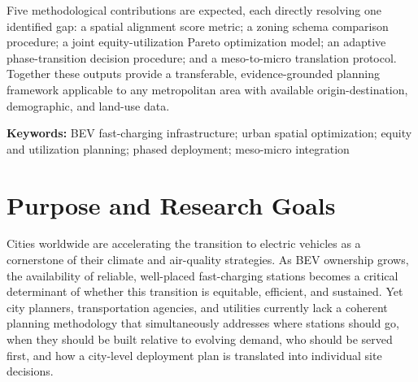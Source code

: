 \documentclass[12pt,letterpaper]{article}
\begin{document}
Five methodological contributions are expected, each directly resolving
one identified gap: a spatial alignment score metric; a zoning schema
comparison procedure; a joint equity-utilization Pareto optimization
model; an adaptive phase-transition decision procedure; and a
meso-to-micro translation protocol.  Together these outputs provide
a transferable, evidence-grounded planning framework applicable to any
metropolitan area with available origin-destination, demographic, and
land-use data.

\bigskip
\noindent\textbf{Keywords:} BEV fast-charging infrastructure;
urban spatial optimization; equity and utilization planning;
phased deployment; meso-micro integration

\clearpage
\tableofcontents

\clearpage
\listoftables
{}

\clearpage
{}
\setcounter{page}{1}
\pagestyle{plain}

\section{Purpose and Research Goals}

Cities worldwide are accelerating the transition to electric vehicles as
a cornerstone of their climate and air-quality strategies.  As BEV
ownership grows, the availability of reliable, well-placed fast-charging
stations becomes a critical determinant of whether this transition is
equitable, efficient, and sustained.  Yet city planners, transportation
agencies, and utilities currently lack a coherent planning methodology
that simultaneously addresses where stations should go, when they should
be built relative to evolving demand, who should be served first, and how
a city-level deployment plan is translated into individual site decisions.
\end{document}
